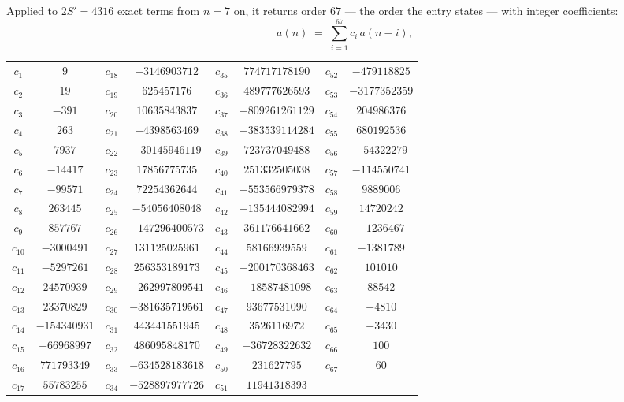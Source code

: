 \documentclass[11pt,a4paper]{article}
\theoremstyle{plain}
\theoremstyle{definition}
\begin{document}
Applied to $2S'=4316$ exact terms from $n=7$ on, it returns order $67$ --- the
order the entry states --- with integer coefficients:
\[
a(n)\;=\;\sum_{i=1}^{67}c_i\,a(n-i),
\]
\begin{center}\small
\begin{tabular}{cccccccc}
$c_{1}$ & $9$ & $c_{18}$ & $-3146903712$ & $c_{35}$ & $774717178190$ & $c_{52}$ & $-479118825$ \\
$c_{2}$ & $19$ & $c_{19}$ & $625457176$ & $c_{36}$ & $489777626593$ & $c_{53}$ & $-3177352359$ \\
$c_{3}$ & $-391$ & $c_{20}$ & $10635843837$ & $c_{37}$ & $-809261261129$ & $c_{54}$ & $204986376$ \\
$c_{4}$ & $263$ & $c_{21}$ & $-4398563469$ & $c_{38}$ & $-383539114284$ & $c_{55}$ & $680192536$ \\
$c_{5}$ & $7937$ & $c_{22}$ & $-30145946119$ & $c_{39}$ & $723737049488$ & $c_{56}$ & $-54322279$ \\
$c_{6}$ & $-14417$ & $c_{23}$ & $17856775735$ & $c_{40}$ & $251332505038$ & $c_{57}$ & $-114550741$ \\
$c_{7}$ & $-99571$ & $c_{24}$ & $72254362644$ & $c_{41}$ & $-553566979378$ & $c_{58}$ & $9889006$ \\
$c_{8}$ & $263445$ & $c_{25}$ & $-54056408048$ & $c_{42}$ & $-135444082994$ & $c_{59}$ & $14720242$ \\
$c_{9}$ & $857767$ & $c_{26}$ & $-147296400573$ & $c_{43}$ & $361176641662$ & $c_{60}$ & $-1236467$ \\
$c_{10}$ & $-3000491$ & $c_{27}$ & $131125025961$ & $c_{44}$ & $58166939559$ & $c_{61}$ & $-1381789$ \\
$c_{11}$ & $-5297261$ & $c_{28}$ & $256353189173$ & $c_{45}$ & $-200170368463$ & $c_{62}$ & $101010$ \\
$c_{12}$ & $24570939$ & $c_{29}$ & $-262997809541$ & $c_{46}$ & $-18587481098$ & $c_{63}$ & $88542$ \\
$c_{13}$ & $23370829$ & $c_{30}$ & $-381635719561$ & $c_{47}$ & $93677531090$ & $c_{64}$ & $-4810$ \\
$c_{14}$ & $-154340931$ & $c_{31}$ & $443441551945$ & $c_{48}$ & $3526116972$ & $c_{65}$ & $-3430$ \\
$c_{15}$ & $-66968997$ & $c_{32}$ & $486095848170$ & $c_{49}$ & $-36728322632$ & $c_{66}$ & $100$ \\
$c_{16}$ & $771793349$ & $c_{33}$ & $-634528183618$ & $c_{50}$ & $231627795$ & $c_{67}$ & $60$ \\
$c_{17}$ & $55783255$ & $c_{34}$ & $-528897977726$ & $c_{51}$ & $11941318393$ &  &  \\
\end{tabular}
\end{center}
\end{document}
